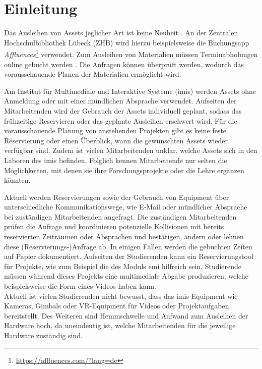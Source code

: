 
\chapter{Einleitung}
Das Ausleihen von Assets jeglicher Art ist keine Neuheit \cite{soderholm2018borrowing}. An der
Zentralen Hochschulbibliothek Lübeck (ZHB) wird hierzu beispielsweise die Buchungsapp
\textit{Affluences}\footnote{\url{https://affluences.com/?lang=de}} verwendet. Zum Ausleihen von
Materialien müssen Terminabholungen online gebucht werden \cite{zhb_offnung_nodate}. Die Anfragen
können überprüft werden, wodurch das vorausschauende Planen der Materialien ermöglicht wird. 

Am Institut für Multimediale und Interaktive Systeme (\ac{imis}) werden Assets ohne Anmeldung oder
mit einer mündlichen Absprache verwendet. Aufseiten der Mitarbeitenden wird der Gebrauch der Assets
individuell geplant, sodass das frühzeitige Reservieren oder das geplante Ausleihen erschwert wird.
Für die vorausschauende Planung von anstehenden Projekten gibt es keine feste Reservierung oder
einen Überblick, wann die gewünschten Assets wieder verfügbar sind. Zudem ist vielen Mitarbeitenden
unklar, welche Assets sich in den Laboren des \ac{imis} befinden. Folglich kennen Mitarbeitende nur
selten die Möglichkeiten, mit denen sie ihre Forschungsprojekte oder die Lehre ergänzen könnten.

Aktuell werden Reservierungen sowie der Gebrauch von Equipment über unterschiedliche
Kommunikationswege, wie E-Mail oder mündlicher Absprache bei zuständigen Mitarbeitenden angefragt.
Die zuständigen Mitarbeitenden prüfen die Anfrage und koordinieren potenzielle Kollisionen mit
bereits reservierten Zeiträumen oder Absprachen und bestätigen, ändern oder lehnen diese
(Reservierungs-)Anfrage ab. In einigen Fällen werden die gebuchten Zeiten auf Papier dokumentiert.
Aufseiten der Studierenden kann ein Reservierungstool für Projekte, wie zum Beispiel die des Moduls
\ac{emi} hilfreich sein. Studierende müssen während dieses Projekts eine multimediale Abgabe
produzieren, welche beispielsweise die Form eines Videos haben kann.\\ Aktuell ist vielen
Studierenden nicht bewusst, dass das \ac{imis} Equipment wie Kameras, Gimbals oder VR-Equipment für
Videos oder Projektaufgaben bereitstellt. Des Weiteren sind Hemmschwelle und Aufwand zum Ausleihen
der Hardware hoch, da uneindeutig ist, welche Mitarbeitenden für die jeweilige Hardware zuständig
sind.

